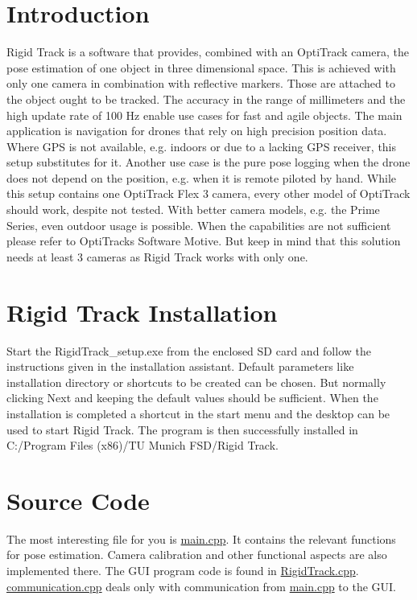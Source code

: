 \hypertarget{index_intro_sec}{}\section{Introduction}\label{index_intro_sec}
Rigid Track is a software that provides, combined with an Opti\+Track camera, the pose estimation of one object in three dimensional space. This is achieved with only one camera in combination with reflective markers. Those are attached to the object ought to be tracked. The accuracy in the range of millimeters and the high update rate of 100 Hz enable use cases for fast and agile objects. The main application is navigation for drones that rely on high precision position data. Where G\+PS is not available, e.\+g. indoors or due to a lacking G\+PS receiver, this setup substitutes for it. Another use case is the pure pose logging when the drone does not depend on the position, e.\+g. when it is remote piloted by hand. While this setup contains one Opti\+Track Flex 3 camera, every other model of Opti\+Track should work, despite not tested. With better camera models, e.\+g. the Prime Series, even outdoor usage is possible. When the capabilities are not sufficient please refer to Opti\+Tracks Software Motive. But keep in mind that this solution needs at least 3 cameras as Rigid Track works with only one.\hypertarget{index_softInstall_sec}{}\section{Rigid Track Installation}\label{index_softInstall_sec}
Start the Rigid\+Track\+\_\+setup.\+exe from the enclosed SD card and follow the instructions given in the installation assistant. Default parameters like installation directory or shortcuts to be created can be chosen. But normally clicking Next and keeping the default values should be sufficient. When the installation is completed a shortcut in the start menu and the desktop can be used to start Rigid Track. The program is then successfully installed in C\+:/\+Program Files (x86)/\+TU Munich F\+S\+D/\+Rigid Track.\hypertarget{index_source_code}{}\section{Source Code}\label{index_source_code}
The most interesting file for you is \hyperlink{main_8cpp}{main.\+cpp}. It contains the relevant functions for pose estimation. Camera calibration and other functional aspects are also implemented there. The G\+UI program code is found in \hyperlink{_rigid_track_8cpp}{Rigid\+Track.\+cpp}. \hyperlink{communication_8cpp}{communication.\+cpp} deals only with communication from \hyperlink{main_8cpp}{main.\+cpp} to the G\+UI. 
